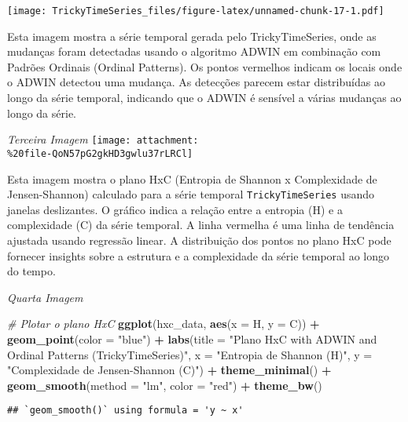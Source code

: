 \documentclass[
]{article}
\newenvironment{Shaded}{\begin{snugshade}}{\end{snugshade}}
\newcommand{\AttributeTok}[1]{\textcolor[rgb]{0.13,0.29,0.53}{#1}}
\newcommand{\CommentTok}[1]{\textcolor[rgb]{0.56,0.35,0.01}{\textit{#1}}}
\newcommand{\FunctionTok}[1]{\textcolor[rgb]{0.13,0.29,0.53}{\textbf{#1}}}
\newcommand{\NormalTok}[1]{#1}
\newcommand{\SpecialCharTok}[1]{\textcolor[rgb]{0.81,0.36,0.00}{\textbf{#1}}}
\newcommand{\StringTok}[1]{\textcolor[rgb]{0.31,0.60,0.02}{#1}}
\begin{document}
\texttt{[image: TrickyTimeSeries\_files/figure-latex/unnamed-chunk-17-1.pdf]}

Esta imagem mostra a série temporal gerada pelo TrickyTimeSeries, onde
as mudanças foram detectadas usando o algoritmo ADWIN em combinação com
Padrões Ordinais (Ordinal Patterns). Os pontos vermelhos indicam os
locais onde o ADWIN detectou uma mudança. As detecções parecem estar
distribuídas ao longo da série temporal, indicando que o ADWIN é
sensível a várias mudanças ao longo da série.

\emph{Terceira Imagem}
\texttt{[image: attachment:\\\%20file-QoN57pG2gkHD3gwlu37rLRCl]}

Esta imagem mostra o plano HxC (Entropia de Shannon x Complexidade de
Jensen-Shannon) calculado para a série temporal
\texttt{TrickyTimeSeries} usando janelas deslizantes. O gráfico indica a
relação entre a entropia (H) e a complexidade (C) da série temporal. A
linha vermelha é uma linha de tendência ajustada usando regressão
linear. A distribuição dos pontos no plano HxC pode fornecer insights
sobre a estrutura e a complexidade da série temporal ao longo do tempo.

\emph{Quarta Imagem}

\begin{Shaded}
\begin{Highlighting}[]
\CommentTok{\# Plotar o plano HxC}
\FunctionTok{ggplot}\NormalTok{(hxc\_data, }\FunctionTok{aes}\NormalTok{(}\AttributeTok{x =}\NormalTok{ H, }\AttributeTok{y =}\NormalTok{ C)) }\SpecialCharTok{+}
  \FunctionTok{geom\_point}\NormalTok{(}\AttributeTok{color =} \StringTok{"blue"}\NormalTok{) }\SpecialCharTok{+}
  \FunctionTok{labs}\NormalTok{(}\AttributeTok{title =} \StringTok{"Plano HxC with ADWIN and Ordinal Patterns (TrickyTimeSeries)"}\NormalTok{,}
       \AttributeTok{x =} \StringTok{"Entropia de Shannon (H)"}\NormalTok{, }\AttributeTok{y =} \StringTok{"Complexidade de Jensen{-}Shannon (C)"}\NormalTok{) }\SpecialCharTok{+}
  \FunctionTok{theme\_minimal}\NormalTok{() }\SpecialCharTok{+}
  \FunctionTok{geom\_smooth}\NormalTok{(}\AttributeTok{method =} \StringTok{"lm"}\NormalTok{, }\AttributeTok{color =} \StringTok{"red"}\NormalTok{) }\SpecialCharTok{+}
  \FunctionTok{theme\_bw}\NormalTok{()}
\end{Highlighting}
\end{Shaded}

\begin{verbatim}
## `geom_smooth()` using formula = 'y ~ x'
\end{verbatim}
\end{document}
